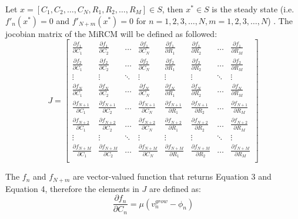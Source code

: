 \documentclass{article}
\begin{document}
Let $x=[C_1, C_2, \dots, C_N, R_1, R_2, \dots, R_M] \in S $, then $x^* \in S $ is the steady state (i.e. $f'_n(x^*) = 0$ and $f'_{N+m}(x^*)=0$ for $n=1, 2, 3,\dots, N, m=1, 2, 3, \dots, N$) . The jocobian matrix of the MiRCM will be defined as followed:
\[ J = 
\begin{bmatrix}

    \frac{\partial{f_1}}{\partial{C_1}} & \frac{\partial{f_1}}{\partial{C_2}} & \dots & \frac{\partial{f_1}}{\partial{C_N}} & \frac{\partial{f_1}}{\partial{R_1}} & \frac{\partial{f_1}}{\partial{R_2}} & \dots & \frac{\partial{f_1}}{\partial{R_M}}\\
    \frac{\partial{f_2}}{\partial{C_1}} & \frac{\partial{f_2}}{\partial{C_2}} & \dots & \frac{\partial{f_2}}{\partial{C_N}} & \frac{\partial{f_2}}{\partial{R_1}} & \frac{\partial{f_2}}{\partial{R_2}} & \dots & \frac{\partial{f_2}}{\partial{R_M}}\\
    \vdots & \vdots  & \ddots & \vdots & \vdots & \vdots & \ddots & \vdots\\
    \frac{\partial{f_N}}{\partial{C_1}} & \frac{\partial{f_N}}{\partial{C_2}} & \dots & \frac{\partial{f_N}}{\partial{C_N}} & \frac{\partial{f_N}}{\partial{R_1}} & \frac{\partial{f_N}}{\partial{R_2}} & \dots & \frac{\partial{f_N}}{\partial{R_M}}\\
    \frac{\partial{f_{N+1}}}{\partial{C_1}} & \frac{\partial{f_{N+1}}}{\partial{C_2}} & \dots & \frac{\partial{f_{N+1}}}{\partial{C_N}} & \frac{\partial{f_{N+1}}}{\partial{R_1}} & \frac{\partial{f_{N+1}}}{\partial{R_2}} & \dots & \frac{\partial{f_{N+1}}}{\partial{R_M}}\\
    \frac{\partial{f_{N+2}}}{\partial{C_1}} & \frac{\partial{f_{N+2}}}{\partial{C_2}} & \dots & \frac{\partial{f_{N+2}}}{\partial{C_N}} & \frac{\partial{f_{N+2}}}{\partial{R_1}} & \frac{\partial{f_{N+2}}}{\partial{R_2}} & \dots & \frac{\partial{f_{N+2}}}{\partial{R_M}}\\
    \vdots & \vdots  & \ddots & \vdots & \vdots & \vdots & \ddots & \vdots\\
    \frac{\partial{f_{N+M}}}{\partial{C_1}} & \frac{\partial{f_{N+M}}}{\partial{C_2}} & \dots & \frac{\partial{f_{N+M}}}{\partial{C_N}} & \frac{\partial{f_{N+M}}}{\partial{R_1}} & \frac{\partial{f_{N+M}}}{\partial{R_2}} & \dots & \frac{\partial{f_{N+M}}}{\partial{R_M}}\\
    
    \end{bmatrix}
    \]

The $f_n$ and $f_{N+m}$ are vector-valued function that returns Equation 3 and Equation 4, therefore the elements in $J$ are defined as:
\begin{equation}
    \frac{\partial{f_n}}{\partial{C_n}} = \mu (v^{grow}_n - \phi_n)
\end{equation}
\end{document}
